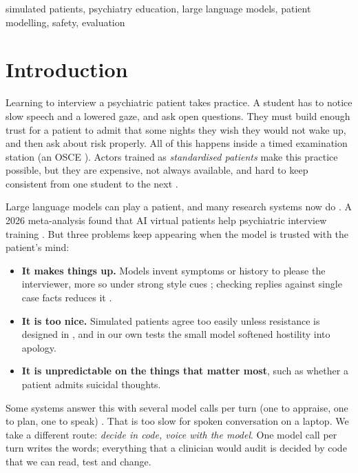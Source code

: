 \documentclass[conference]{IEEEtran}
\begin{document}
\begin{IEEEkeywords}
simulated patients, psychiatry education, large language models, patient modelling, safety, evaluation
\end{IEEEkeywords}

\section{Introduction}
Learning to interview a psychiatric patient takes practice. A student has to notice slow speech and a lowered gaze, and ask open questions. They must build enough trust for a patient to admit that some nights they wish they would not wake up, and then ask about risk properly. All of this happens inside a timed examination station (an OSCE \cite{harden1975osce}). Actors trained as \emph{standardised patients} make this practice possible, but
they are expensive, not always available, and hard to keep consistent from one student to the next \cite{piot2021simulation}.

Large language models can play a patient, and many research systems now do
\cite{chen2023llmempowered,wang2024patient,lee2025psyche,sabour2026patientact,sabour2026patienthub,louie2024roleplaydoh}. A 2026 meta-analysis
found that AI virtual patients help psychiatric interview training \cite{kilincel2026meta}. But three problems keep appearing when the
model is trusted with the patient's mind:
\begin{itemize}
\item \textbf{It makes things up.} Models invent symptoms or history to please the interviewer, more so under strong style cues \cite{chen2023llmempowered}; checking
replies against single case facts reduces it \cite{lai2025patientzero}.
\item \textbf{It is too nice.} Simulated patients agree too easily unless resistance is designed in \cite{steenstra2025scaffolding,lee2025psyche}, and in our
own tests the small model softened hostility into apology.
\item \textbf{It is unpredictable on the things that matter most}, such as whether a patient admits suicidal thoughts.
\end{itemize}

Some systems answer this with several model calls per turn (one to appraise, one to plan, one to speak) \cite{sabour2026patientact}. That is
too slow for spoken conversation on a laptop. We take a different route: \emph{decide in code, voice with the model}. One model call per turn
writes the words; everything that a clinician would audit is decided by code that we can read, test and change.
\end{document}
